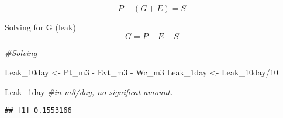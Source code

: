 \documentclass[
]{article}
\newenvironment{Shaded}{\begin{snugshade}}{\end{snugshade}}
\newcommand{\CommentTok}[1]{\textcolor[rgb]{0.56,0.35,0.01}{\textit{#1}}}
\newcommand{\DecValTok}[1]{\textcolor[rgb]{0.00,0.00,0.81}{#1}}
\newcommand{\NormalTok}[1]{#1}
\newcommand{\OtherTok}[1]{\textcolor[rgb]{0.56,0.35,0.01}{#1}}
\newcommand{\SpecialCharTok}[1]{\textcolor[rgb]{0.00,0.00,0.00}{#1}}
\begin{document}
\[ P-(G+E)= S \]

Solving for G (leak) \[  G = P - E - S \]

\begin{Shaded}
\begin{Highlighting}[]
\CommentTok{\#Solving}

\NormalTok{Leak\_10day }\OtherTok{\textless{}{-}}\NormalTok{ Pt\_m3 }\SpecialCharTok{{-}}\NormalTok{ Evt\_m3 }\SpecialCharTok{{-}}\NormalTok{ Wc\_m3}
\NormalTok{Leak\_1day }\OtherTok{\textless{}{-}}\NormalTok{ Leak\_10day}\SpecialCharTok{/}\DecValTok{10}

\NormalTok{Leak\_1day }\CommentTok{\#in m3/day, no significat amount. }
\end{Highlighting}
\end{Shaded}

\begin{verbatim}
## [1] 0.1553166
\end{verbatim}
\end{document}
